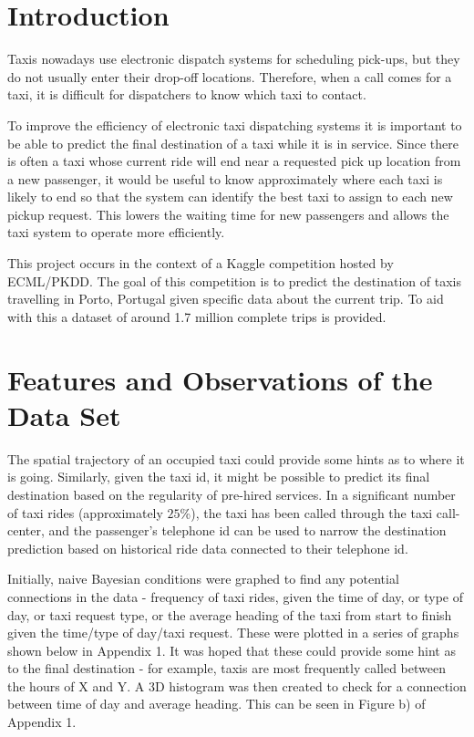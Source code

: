 \documentclass[12pt]{article}
\begin{document}
\maketitle

\section{Introduction}
Taxis nowadays use electronic dispatch systems for scheduling pick-ups, but they do not usually enter their drop-off locations. Therefore, when a call comes for a taxi, it is difficult for dispatchers to know which taxi to contact. 

To improve the efficiency of electronic taxi dispatching systems it is important to be able to predict the final destination of a taxi while it is in service. Since there is often a taxi whose current ride will end near a requested pick up location from a new passenger, it would be useful to know approximately where each taxi is likely to end so that the system can identify the best taxi to assign to each new pickup request. This lowers the waiting time for new passengers and allows the taxi system to operate more efficiently.

This project occurs in the context of a Kaggle competition hosted by ECML/PKDD. The goal of this competition is to predict the destination of taxis travelling in Porto, Portugal given specific data about the current trip. To aid with this a dataset of around 1.7 million complete trips is provided.

\section{Features and Observations of the Data Set}
The spatial trajectory of an occupied taxi could provide some hints as to where it is going. Similarly, given the taxi id, it might be possible to predict its final destination based on the regularity of pre-hired services. In a significant number of taxi rides (approximately $25$\%), the taxi has been called through the taxi call-center, and the passenger's telephone id can be used to narrow the destination prediction based on historical ride data connected to their telephone id.

Initially, naive Bayesian conditions were graphed to find any potential connections in the data - frequency of taxi rides, given the time of day, or type of day, or taxi request type, or the average heading of the taxi from start to finish given the time/type of day/taxi request. These were plotted in a series of graphs shown below in Appendix 1. 
It was hoped that these could provide some hint as to the final destination - for example, taxis are most frequently called between the hours of X and Y. A 3D histogram was then created to check for a connection between time of day and average heading. This can be seen in Figure b) of Appendix 1. 
\end{document}
